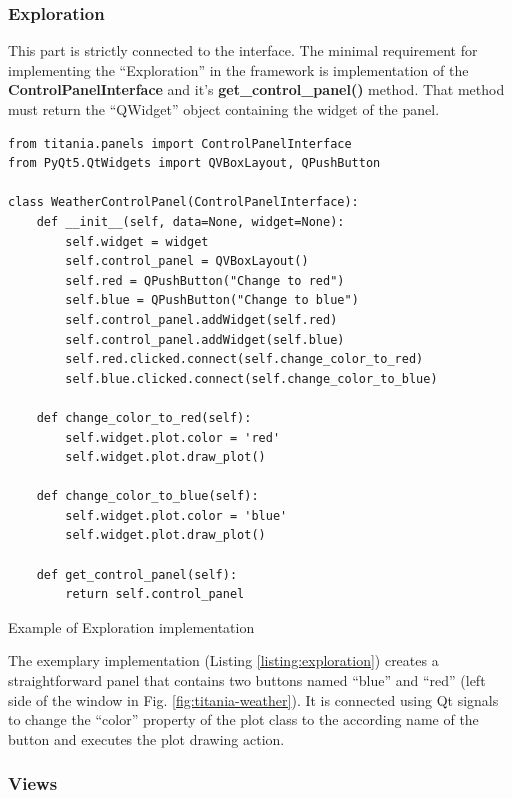 \subsubsection{Exploration}

This part is strictly connected to the interface. The minimal requirement for implementing the ``Exploration'' in the framework is implementation of the \textbf{ControlPanelInterface} and it's \textbf{get\_control\_panel()} method.
That method must return the ``QWidget'' object containing the widget of the panel.

\begin{listing}[H]
\begin{verbatim}
from titania.panels import ControlPanelInterface
from PyQt5.QtWidgets import QVBoxLayout, QPushButton

class WeatherControlPanel(ControlPanelInterface):
    def __init__(self, data=None, widget=None):
        self.widget = widget
        self.control_panel = QVBoxLayout()
        self.red = QPushButton("Change to red")
        self.blue = QPushButton("Change to blue")
        self.control_panel.addWidget(self.red)
        self.control_panel.addWidget(self.blue)
        self.red.clicked.connect(self.change_color_to_red)
        self.blue.clicked.connect(self.change_color_to_blue)

    def change_color_to_red(self):
        self.widget.plot.color = 'red'
        self.widget.plot.draw_plot()

    def change_color_to_blue(self):
        self.widget.plot.color = 'blue'
        self.widget.plot.draw_plot()

    def get_control_panel(self):
        return self.control_panel

\end{verbatim}
\caption{Example of Exploration implementation}
\label{listing:exploration}
\end{listing}

The exemplary implementation (Listing \ref{listing:exploration}) creates a straightforward panel that contains two buttons named ``blue'' and ``red'' (left side of the window in Fig. \ref{fig:titania-weather}).
It is connected using Qt signals to change the ``color'' property of the plot class to the according name of the button and executes the plot drawing action.

\subsubsection{Views}

